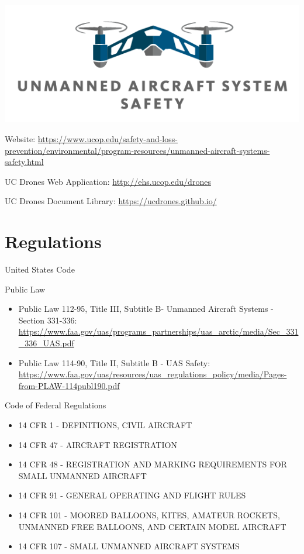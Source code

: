 \documentclass[
]{book}
\providecommand{\tightlist}{%
  \setlength{\itemsep}{0pt}\setlength{\parskip}{0pt}}
\begin{document}
\begin{center}\includegraphics[width=0.5\linewidth]{images/COE_logo} \end{center}

Website: \url{https://www.ucop.edu/safety-and-loss-prevention/environmental/program-resources/unmanned-aircraft-systems-safety.html}

UC Drones Web Application: \url{http://ehs.ucop.edu/drones}

UC Drones Document Library: \url{https://ucdrones.github.io/}

\hypertarget{regulations}{%
\section{Regulations}\label{regulations}}

United States Code

Public Law

\begin{itemize}
\tightlist
\item
  Public Law 112-95, Title III, Subtitle B- Unmanned Aircraft Systems - Section 331-336: \url{https://www.faa.gov/uas/programs_partnerships/uas_arctic/media/Sec_331_336_UAS.pdf}
\item
  Public Law 114-90, Title II, Subtitle B - UAS Safety: \url{https://www.faa.gov/uas/resources/uas_regulations_policy/media/Pages-from-PLAW-114publ190.pdf}
\end{itemize}

Code of Federal Regulations

\begin{itemize}
\tightlist
\item
  14 CFR 1 - DEFINITIONS, CIVIL AIRCRAFT
\item
  14 CFR 47 - AIRCRAFT REGISTRATION
\item
  14 CFR 48 - REGISTRATION AND MARKING REQUIREMENTS FOR SMALL UNMANNED AIRCRAFT
\item
  14 CFR 91 - GENERAL OPERATING AND FLIGHT RULES
\item
  14 CFR 101 - MOORED BALLOONS, KITES, AMATEUR ROCKETS, UNMANNED FREE BALLOONS, AND CERTAIN MODEL AIRCRAFT
\item
  14 CFR 107 - SMALL UNMANNED AIRCRAFT SYSTEMS
\end{itemize}
\end{document}
